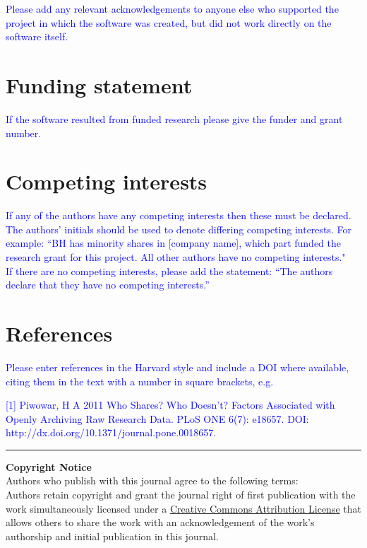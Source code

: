 \documentclass{jors}
\begin{document}
\textcolor{blue}{Please add any relevant acknowledgements to anyone else who supported the project in which the software was created, but did not work directly on the software itself.}

\section*{Funding statement}

\textcolor{blue}{If the software resulted from funded research please give the funder and grant number.}

\section*{Competing interests}

\textcolor{blue}{If any of the authors have any competing interests then these must be declared. The authors’ initials should be used to denote differing competing interests. For example: “BH has minority shares in [company name], which part funded the research grant for this project. All other authors have no competing interests." \\
If there are no competing interests, please add the statement:
“The authors declare that they have no competing interests.” }

\section*{References}

\textcolor{blue}{Please enter references in the Harvard style and include a DOI where available, citing them in the text with a number in square brackets, e.g. \\ }

\textcolor{blue}{[1] Piwowar, H A 2011 Who Shares? Who Doesn't? Factors Associated with Openly Archiving Raw Research Data. PLoS ONE 6(7): e18657. DOI: \\ http://dx.doi.org/10.1371/journal.pone.0018657.}

\vspace{2cm}

\rule{\textwidth}{1pt}

{ \bf Copyright Notice} \\
Authors who publish with this journal agree to the following terms: \\

Authors retain copyright and grant the journal right of first publication with the work simultaneously licensed under a  \href{http://creativecommons.org/licenses/by/3.0/}{Creative Commons Attribution License} that allows others to share the work with an acknowledgement of the work's authorship and initial publication in this journal. \\
\end{document}
